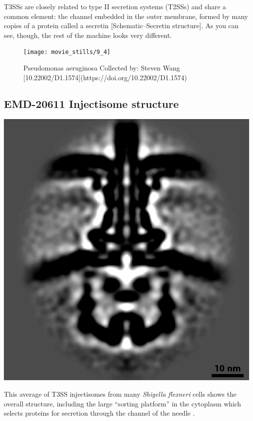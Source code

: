 \documentclass[]{tufte-book}
\begin{document}
T3SSs are closely related to type II secretion systems (T2SSs) and share
a common element: the channel embedded in the outer membrane, formed by
many copies of a protein called a secretin {[}Schematic--Secretin
structure{]}. As you can see, though, the rest of the machine looks very
different.

\begin{figure}
\texttt{[image: movie\_stills/9\_4]} \caption[Pseudomonas aeruginosa Collected by]{Pseudomonas aeruginosa Collected by: Steven Wang [10.22002/D1.1574](https://doi.org/10.22002/D1.1574)}\label{fig:unnamed-chunk-157}
\end{figure}

\subsection{EMD-20611 Injectisome
structure}\label{EMD-20611_Injectisome_structure}

\includegraphics{img/schematics/9_4_1}

This average of T3SS injectisomes from many \emph{Shigella flexneri}
cells shows the overall structure, including the large ``sorting
platform'' in the cytoplasm which selects proteins for secretion through
the channel of the needle \citet{tachiyama2019}.
\end{document}
